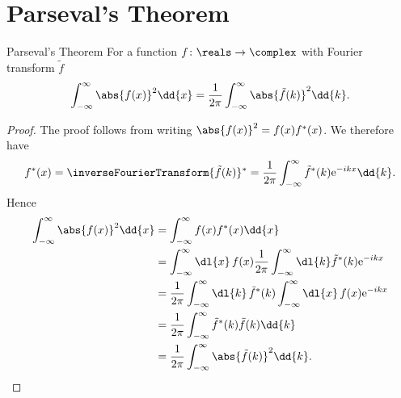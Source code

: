 \documentclass[fleqn]{NotesClass}
\newcommand*{\e}{\mathrm{e}}
\begin{document}
    \section{Parseval's Theorem}
    \begin{thm}{Parseval's Theorem}{}
        For a function \(f \colon \reals \to \complex\) with Fourier transform \(\tilde{f}\)
        \begin{equation}
            \int_{-\infty}^{\infty} \abs{f(x)}^2 \dd{x} = \frac{1}{2\pi} \int_{-\infty}^{\infty} \abs{\tilde{f}(k)}^2 \dd{k}.
        \end{equation}
        \begin{proof}
            The proof follows from writing \(\abs{f(x)}^2 = f(x)f^*(x)\).
            We therefore have
            \begin{equation}
                f^*(x) = \inverseFourierTransform\{ \tilde{f}(k) \}^* = \frac{1}{2\pi} \int_{-\infty}^{\infty} \tilde{f}^*(k) \e^{-ikx} \dd{k}.
            \end{equation}
            Hence
            \begin{align}
                \int_{-\infty}^{\infty} \abs{f(x)}^2 \dd{x} &= \int_{-\infty}^{\infty} f(x)f^*(x) \dd{x}\\
                &= \int_{-\infty}^{\infty} \dl{x} \, f(x) \frac{1}{2\pi} \int_{-\infty}^{\infty} \dl{k} \tilde{f}^*(k) \e^{-ikx}\\
                &= \frac{1}{2\pi} \int_{-\infty}^{\infty} \dl{k} \, \tilde{f}^*(k) \int_{-\infty}^{\infty} \dl{x} \, f(x) \e^{-ikx}\\
                &= \frac{1}{2\pi} \int_{-\infty}^{\infty} \tilde{f}^*(k) \tilde{f}(k) \dd{k}\\
                &= \frac{1}{2\pi} \int_{-\infty}^{\infty} \abs{\tilde{f}(k)}^2 \dd{k}.
            \end{align}
        \end{proof}
    \end{thm}
    
\end{document}
